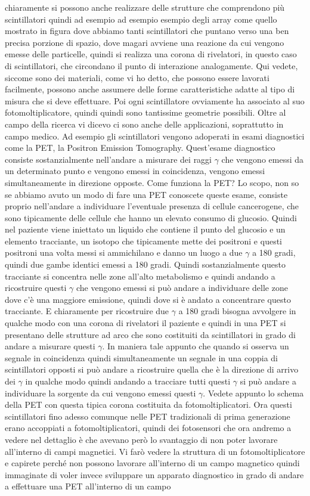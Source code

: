 {chiaramente si possono anche realizzare delle strutture che comprendono più scintillatori quindi ad esempio ad esempio esempio degli array come quello mostrato in figura dove abbiamo tanti scintillatori che puntano verso una ben precisa porzione di spazio, dove magari avviene una reazione da cui vengono emesse delle particelle, quindi si realizza una corona di rivelatori, in questo caso di scintillatori, che circondano il punto di interazione analogamente. Qui vedete, siccome sono dei materiali, come vi ho detto, che possono essere lavorati facilmente, possono anche assumere delle forme caratteristiche adatte al tipo di misura che si deve effettuare. Poi ogni scintillatore ovviamente ha associato al suo fotomoltiplicatore, quindi quindi sono tantissime geometrie possibili. Oltre al campo della ricerca vi dicevo ci sono anche delle applicazioni, soprattutto in campo medico. Ad esempio gli scintillatori vengono adoperati in esami diagnostici come la PET, la Positron Emission Tomography. Quest'esame diagnostico consiste sostanzialmente nell'andare a misurare dei raggi $\gamma$ che vengono emessi da un determinato punto e vengono emessi in coincidenza, vengono emessi simultaneamente in direzione opposte. Come funziona la PET? Lo scopo, non so se abbiamo avuto un modo di fare una PET conoscete queste esame, consiste proprio nell'andare a individuare l'eventuale presenza di cellule cancerogene, che sono tipicamente delle cellule che hanno un elevato consumo di glucosio. Quindi nel paziente viene iniettato un liquido che contiene il punto del glucosio e un elemento tracciante, un isotopo che tipicamente mette dei positroni e questi positroni una volta messi si ammichilano e danno un luogo a due $\gamma$ a 180 gradi, quindi due gambe identici emessi a 180 gradi. Quindi sostanzialmente questo tracciante si concentra nelle zone all'alto metabolismo e quindi andando a ricostruire questi $\gamma$ che vengono emessi si può andare a individuare delle zone dove c'è una maggiore emissione, quindi dove si è andato a concentrare questo tracciante. E chiaramente per ricostruire due $\gamma$ a 180 gradi bisogna avvolgere in qualche modo con una corona di rivelatori il paziente e quindi in una PET si presentano delle strutture ad arco che sono costituiti da scintillatori in grado di andare a misurare questi $\gamma$. In maniera tale appunto che quando si osserva un segnale in coincidenza quindi simultaneamente un segnale in una coppia di scintillatori opposti si può andare a ricostruire quella che è la direzione di arrivo dei $\gamma$ in qualche modo quindi andando a tracciare tutti questi $\gamma$ si può andare a individuare la sorgente da cui vengono emessi questi $\gamma$. Vedete appunto lo schema della PET con questa tipica corona costituita da fotomoltiplicatori. Ora questi scintillatori fino adesso comunque nelle PET tradizionali di prima generazione erano accoppiati a fotomoltiplicatori, quindi dei fotosensori che ora andremo a vedere nel dettaglio è che avevano però lo svantaggio di non poter lavorare all'interno di campi magnetici. Vi farò vedere la struttura di un fotomoltiplicatore e capirete perché non possono lavorare all'interno di un campo magnetico quindi immaginate di voler invece sviluppare un apparato diagnostico in grado di andare a effettuare una PET all'interno di un campo }

